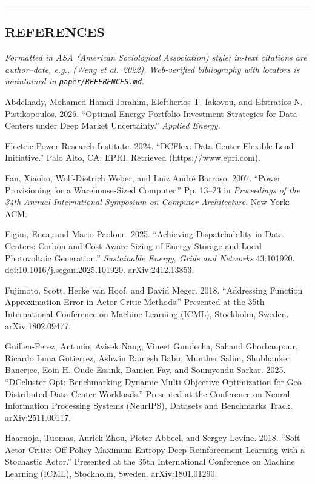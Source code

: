 \documentclass[
  11pt,
]{article}
\begin{document}
\begin{center}\rule{0.5\linewidth}{0.5pt}\end{center}

\subsection{REFERENCES}\label{references}

\emph{Formatted in ASA (American Sociological Association) style;
in-text citations are author--date, e.g., (Weng et al.~2022).
Web-verified bibliography with locators is maintained in
\texttt{paper/REFERENCES.md}.}

Abdelhady, Mohamed Hamdi Ibrahim, Eleftherios T. Iakovou, and Efstratios
N. Pistikopoulos. 2026. ``Optimal Energy Portfolio Investment Strategies
for Data Centers under Deep Market Uncertainty.'' \emph{Applied Energy}.

Electric Power Research Institute. 2024. ``DCFlex: Data Center Flexible
Load Initiative.'' Palo Alto, CA: EPRI. Retrieved
(https://www.epri.com).

Fan, Xiaobo, Wolf-Dietrich Weber, and Luiz André Barroso. 2007. ``Power
Provisioning for a Warehouse-Sized Computer.'' Pp. 13--23 in
\emph{Proceedings of the 34th Annual International Symposium on Computer
Architecture}. New York: ACM.

Figini, Enea, and Mario Paolone. 2025. ``Achieving Dispatchability in
Data Centers: Carbon and Cost-Aware Sizing of Energy Storage and Local
Photovoltaic Generation.'' \emph{Sustainable Energy, Grids and Networks}
43:101920. doi:10.1016/j.segan.2025.101920. arXiv:2412.13853.

Fujimoto, Scott, Herke van Hoof, and David Meger. 2018. ``Addressing
Function Approximation Error in Actor-Critic Methods.'' Presented at the
35th International Conference on Machine Learning (ICML), Stockholm,
Sweden. arXiv:1802.09477.

Guillen-Perez, Antonio, Avisek Naug, Vineet Gundecha, Sahand
Ghorbanpour, Ricardo Luna Gutierrez, Ashwin Ramesh Babu, Munther Salim,
Shubhanker Banerjee, Eoin H. Oude Essink, Damien Fay, and Soumyendu
Sarkar. 2025. ``DCcluster-Opt: Benchmarking Dynamic Multi-Objective
Optimization for Geo-Distributed Data Center Workloads.'' Presented at
the Conference on Neural Information Processing Systems (NeurIPS),
Datasets and Benchmarks Track. arXiv:2511.00117.

Haarnoja, Tuomas, Aurick Zhou, Pieter Abbeel, and Sergey Levine. 2018.
``Soft Actor-Critic: Off-Policy Maximum Entropy Deep Reinforcement
Learning with a Stochastic Actor.'' Presented at the 35th International
Conference on Machine Learning (ICML), Stockholm, Sweden.
arXiv:1801.01290.
\end{document}
